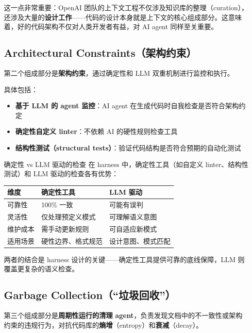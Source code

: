 \documentclass[a4paper]{article}
\begin{document}
这一点非常重要：OpenAI 团队的上下文工程不仅涉及知识库的整理（curation），还涉及大量的\textbf{设计工作}------代码的设计本身就是上下文的核心组成部分。这意味着，好的代码架构不仅对人类开发者有益，对 AI agent 同样至关重要。

\subsection{Architectural Constraints（架构约束）}

第二个组成部分是\textbf{架构约束}，通过确定性和 LLM 双重机制进行监控和执行。

具体包括：
\begin{itemize}[leftmargin=1.5em]
    \item \textbf{基于 LLM 的 agent 监控}：AI agent 在生成代码时自我检查是否符合架构约定
    \item \textbf{确定性自定义 linter}：不依赖 AI 的硬性规则检查工具
    \item \textbf{结构性测试（structural tests）}：验证代码结构是否符合预期的自动化测试
\end{itemize}

\begin{knowledgebox}{确定性 vs LLM 驱动的检查}
在 harness 中，确定性工具（如自定义 linter、结构性测试）和 LLM 驱动的检查各有优势：

\begin{table}[H]
\centering
\begin{tabular}{lll}
\toprule
\textbf{维度} & \textbf{确定性工具} & \textbf{LLM 驱动} \\
\midrule
可靠性 & 100\% 一致 & 可能有误判 \\
灵活性 & 仅处理预定义模式 & 可理解语义意图 \\
维护成本 & 需手动更新规则 & 可自适应新模式 \\
适用场景 & 硬性边界、格式规范 & 设计意图、模式匹配 \\
\bottomrule
\end{tabular}
\end{table}

两者的结合是 harness 设计的关键------确定性工具提供可靠的底线保障，LLM 则覆盖更复杂的语义检查。
\end{knowledgebox}

\subsection{Garbage Collection（``垃圾回收''）}

第三个组成部分是\textbf{周期性运行的清理 agent}，负责发现文档中的不一致性或架构约束的违规行为，对抗代码库的\textbf{熵增}（entropy）和\textbf{衰减}（decay）。
\end{document}
